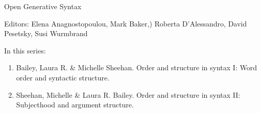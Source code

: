 {\large Open Generative Syntax}

\bigskip

Editors:   Elena Anagnostopoulou,
    Mark Baker,)
    Roberta D’Alessandro,
    David Pesetsky,
    Susi Wurmbrand


\bigskip

In this series:

\begin{enumerate}
\item Bailey, Laura R. \& Michelle Sheehan. Order and structure in syntax I: Word order and syntactic structure.
\item Sheehan, Michelle \& Laura R. Bailey.  Order and structure in syntax II: Subjecthood and argument structure.
\end{enumerate}



\vfill



